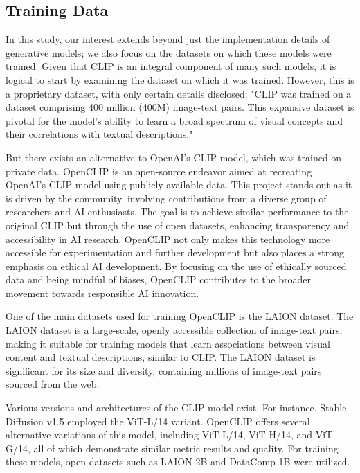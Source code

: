 \documentclass[12pt, letterpaper]{article}
\begin{document}
\subsection{Training Data}

In this study, our interest extends beyond just the implementation details of generative models; we also focus on the datasets on which these models were trained. Given that CLIP is an integral component of many such models, it is logical to start by examining the dataset on which it was trained. However, this is a proprietary dataset, with only certain details disclosed:
"CLIP was trained on a dataset comprising 400 million (400M) image-text pairs. This expansive dataset is pivotal for the model's ability to learn a broad spectrum of visual concepts and their correlations with textual descriptions." 

But there exists an alternative to OpenAI's CLIP model, which was trained on private data. OpenCLIP \cite{cherti2022reproducible} is an open-source endeavor aimed at recreating OpenAI's CLIP model using publicly available data. This project stands out as it is driven by the community, involving contributions from a diverse group of researchers and AI enthusiasts. The goal is to achieve similar performance to the original CLIP but through the use of open datasets, enhancing transparency and accessibility in AI research. OpenCLIP not only makes this technology more accessible for experimentation and further development but also places a strong emphasis on ethical AI development. By focusing on the use of ethically sourced data and being mindful of biases, OpenCLIP contributes to the broader movement towards responsible AI innovation.

One of the main datasets used for training OpenCLIP is the LAION dataset. The LAION dataset is a large-scale, openly accessible collection of image-text pairs, making it suitable for training models that learn associations between visual content and textual descriptions, similar to CLIP. The LAION dataset is significant for its size and diversity, containing millions of image-text pairs sourced from the web.

Various versions and architectures of the CLIP model exist. For instance, Stable Diffusion v1.5 employed the ViT-L/14 variant. OpenCLIP offers several alternative variations of this model, including ViT-L/14, ViT-H/14, and ViT-G/14, all of which demonstrate similar metric results and quality. For training these models, open datasets such as LAION-2B \cite{schuhmann2022laion5b} and DataComp-1B \cite{gadre2023datacomp} were utilized.
\end{document}

